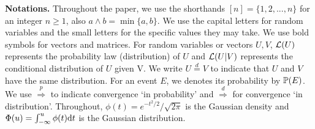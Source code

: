 \documentclass[11pt]{article}
\begin{document}


\noindent\textbf{Notations.} Throughout the paper, we use the shorthands $[n]=\{1,2,...,n\}$ for an integer $n\geq1$,  also $a\wedge b=\min\{a,b\}$. We use the capital letters for random variables and the small letters for the specific values they may take. We use bold symbols for vectors and matrices. %
 For random variables or vectors $U,V$, $\mathcal{L}(U)$ represents the probability law (distribution) of $U$ and $\mathcal{L}(U|V)$ represents the conditional distribution of $U$ given V. We write $U\stackrel{d}{=}V$ to indicate that $U$ and $V$ have the same distribution. 
 For an event $E$, we denotes its probability by ${\mathbb P}(E)$.  We use $\stackrel{p}{\Rightarrow}$ to indicate convergence `in probability' and $\stackrel{d}{\Rightarrow}$ for convergence `in distribution'. 
 Throughout, $\phi(t) = e^{-t^2/2}/\sqrt{2\pi}$ is the Gaussian density and $\Phi(u) = \int_{-\infty}^u \phi(t){\rm d} t$ is the Gaussian distribution.
\end{document}
